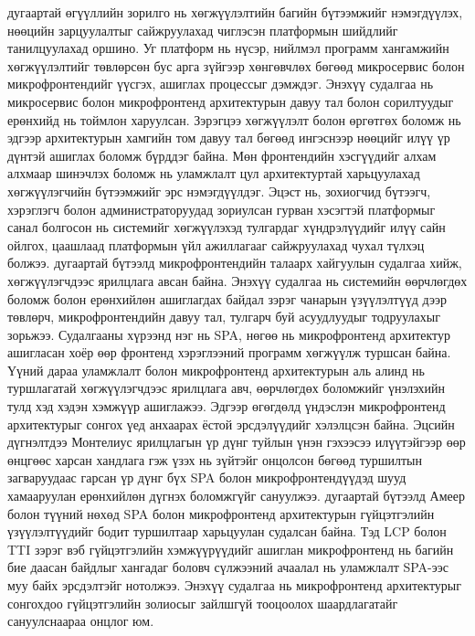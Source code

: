 \newline
\hspace*{0.6cm}\cite{tilak2020} дугаартай өгүүллийн зорилго нь хөгжүүлэлтийн багийн бүтээмжийг нэмэгдүүлэх, нөөцийн зарцуулалтыг сайжруулахад чиглэсэн платформын шийдлийг танилцуулахад оршино. Уг платформ нь нүсэр, нийлмэл программ хангамжийн хөгжүүлэлтийг төвлөрсөн бус арга зүйгээр хөнгөвчлөх бөгөөд микросервис болон микрофронтендийг үүсгэх, ашиглах процессыг дэмждэг. Энэхүү судалгаа нь микросервис болон микрофронтенд архитектурын давуу тал болон сорилтуудыг ерөнхийд нь тоймлон харуулсан. Зэрэгцээ хөгжүүлэлт болон өргөтгөх боломж нь эдгээр архитектурын хамгийн том давуу тал бөгөөд ингэснээр нөөцийг илүү үр дүнтэй ашиглах боломж бүрддэг байна. Мөн фронтендийн хэсгүүдийг алхам алхмаар шинэчлэх боломж нь уламжлалт цул архитектуртай харьцуулахад хөгжүүлэгчийн бүтээмжийг эрс нэмэгдүүлдэг. Эцэст нь, зохиогчид бүтээгч, хэрэглэгч болон администраторуудад зориулсан гурван хэсэгтэй платформыг санал болгосон нь системийг хөгжүүлэхэд тулгардаг хүндрэлүүдийг илүү сайн ойлгох, цаашлаад платформын үйл ажиллагааг сайжруулахад чухал түлхэц болжээ.
\newline
\hspace*{0.6cm}\cite{montelius2021} дугаартай бүтээлд микрофронтендийн талаарх хайгуулын судалгаа хийж, хөгжүүлэгчдээс ярилцлага авсан байна. Энэхүү судалгаа нь системийн өөрчлөгдөх боломж болон ерөнхийлөн ашиглагдах байдал зэрэг чанарын үзүүлэлтүүд дээр төвлөрч, микрофронтендийн давуу тал, тулгарч буй асуудлуудыг тодруулахыг зорьжээ. Судалгааны хүрээнд нэг нь SPA, нөгөө нь микрофронтенд архитектур ашигласан хоёр өөр фронтенд хэрэглээний программ хөгжүүлж туршсан байна. Үүний дараа уламжлалт болон микрофронтенд архитектурын аль алинд нь туршлагатай хөгжүүлэгчдээс ярилцлага авч, өөрчлөгдөх боломжийг үнэлэхийн тулд хэд хэдэн хэмжүүр ашиглажээ. Эдгээр өгөгдөлд үндэслэн микрофронтенд архитектурыг сонгох үед анхаарах ёстой эрсдэлүүдийг хэлэлцсэн байна. Эцсийн дүгнэлтдээ Монтелиус ярилцлагын үр дүнг туйлын үнэн гэхээсээ илүүтэйгээр өөр өнцгөөс харсан хандлага гэж үзэх нь зүйтэйг онцолсон бөгөөд туршилтын загваруудаас гарсан үр дүнг бүх SPA болон микрофронтендүүдэд шууд хамааруулан ерөнхийлөн дүгнэх боломжгүйг сануулжээ.
\newline
\hspace*{0.6cm}\cite{ameer2024} дугаартай бүтээлд Амеер болон түүний нөхөд SPA болон микрофронтенд архитектурын гүйцэтгэлийн үзүүлэлтүүдийг бодит туршилтаар харьцуулан судалсан байна. Тэд LCP болон TTI зэрэг вэб гүйцэтгэлийн хэмжүүрүүдийг ашиглан микрофронтенд нь багийн бие даасан байдлыг хангадаг боловч сүлжээний ачаалал нь уламжлалт SPA-ээс муу байх эрсдэлтэйг нотолжээ. Энэхүү судалгаа нь микрофронтенд архитектурыг сонгохдоо гүйцэтгэлийн золиосыг зайлшгүй тооцоолох шаардлагатайг сануулснаараа онцлог юм.
